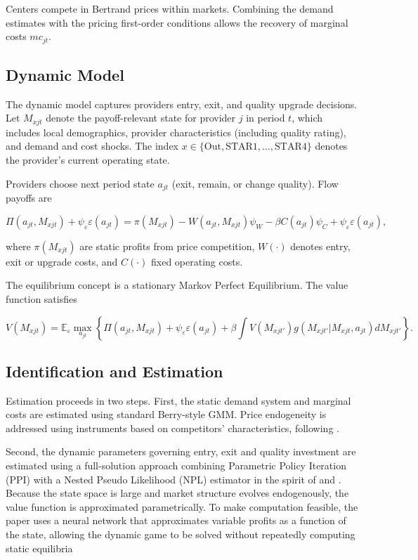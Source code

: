 \documentclass{article}
\begin{document}
Centers compete in Bertrand prices within markets. Combining the demand estimates with the pricing first-order conditions allows the recovery of marginal costs $mc_{jt}$.

\subsection{Dynamic Model}

The dynamic model captures providers entry, exit, and quality upgrade decisions. Let $M_{xjt}$ denote the payoff-relevant state for provider $j$ in period $t$, which includes local demographics, provider characteristics (including quality rating), and demand and cost shocks. The index $x \in \{\text{Out}, \text{STAR1},\dots,\text{STAR4}\}$ denotes the provider's current operating state.

Providers choose next period state $a_{jt}$ (exit, remain, or change quality). Flow payoffs are

\[
\Pi(a_{jt},M_{xjt}) + \psi_{\varepsilon}\varepsilon(a_{jt})
=
\pi(M_{xjt})
- W(a_{jt},M_{xjt})\psi_W
- \beta C(a_{jt})\psi_C
+ \psi_{\varepsilon}\varepsilon(a_{jt}),
\]

where $\pi(M_{xjt})$ are static profits from price competition, $W(\cdot)$ denotes entry, exit or upgrade costs, and $C(\cdot)$ fixed operating costs.

The equilibrium concept is a stationary Markov Perfect Equilibrium. The value function satisfies

\[
V(M_{xjt})
=
\mathbb{E}_{\varepsilon}
\max_{a_{jt}}
\left\{
\Pi(a_{jt},M_{xjt})
+
\psi_{\varepsilon}\varepsilon(a_{jt})
+
\beta
\int
V(M_{xjt'})
g(M_{xjt'}|M_{xjt},a_{jt})
dM_{xjt'}
\right\}.
\]
\subsection{Identification and Estimation}

Estimation proceeds in two steps. First, the static demand system and marginal costs are estimated using standard Berry-style GMM. Price endogeneity is addressed using instruments based on competitors’ characteristics, following \citet{gandhi2019measuring}.

Second, the dynamic parameters governing entry, exit and quality investment are estimated using a full-solution approach combining Parametric Policy Iteration (PPI) with a Nested Pseudo Likelihood (NPL) estimator in the spirit of \citet{aguirregabiria_mira} and \citet{sweeting2013}. Because the state space is large and market structure evolves endogenously, the value function is approximated parametrically. To make computation feasible, the paper uses a neural network that approximates variable profits as a function of the state, allowing the dynamic game to be solved without repeatedly computing static equilibria
\end{document}
